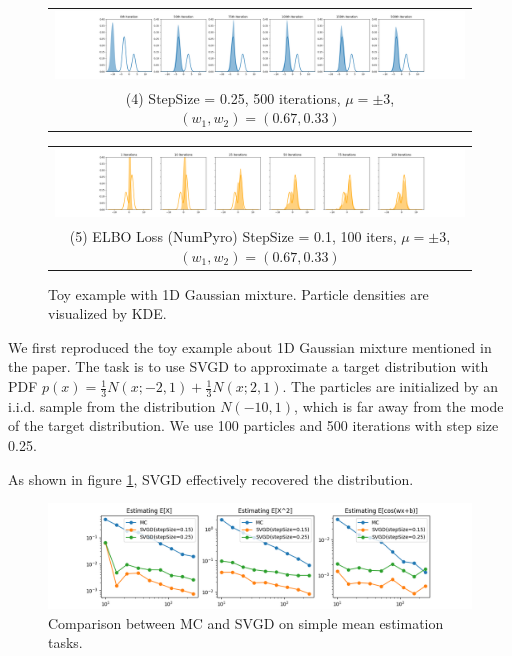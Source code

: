 \begin{figure}[!htbp]
    \begin{tabular}{@{}c@{}}
        \includegraphics[width=\textwidth]{figs/toy-figure1_step0.25_mu3.0_w0.67_gaussian.png} \\
        \small (4) StepSize = 0.25, 500 iterations, $\mu = \pm 3$, $(w_1, w_2) = (0.67, 0.33)$
    \end{tabular}
    
    
    \begin{tabular}{@{}c@{}}
        \includegraphics[width=\textwidth]{figs/toy-figure1-numpyro.png} \\
        \small (5) ELBO Loss (NumPyro) StepSize = 0.1, 100 iters, $\mu = \pm 3$, $(w_1, w_2) = (0.67, 0.33)$
    \end{tabular}
     
    \caption{Toy example with 1D Gaussian mixture. Particle densities are visualized by KDE.}
    \label{fig:toy1dgaussian}
\end{figure}

We first reproduced the toy example about 1D Gaussian mixture mentioned in the paper. The task is to use SVGD to approximate a target distribution with PDF $p(x) = \frac{1}{3} N(x; -2, 1) + \frac{1}{3} N(x; 2, 1)$. The particles are initialized by an i.i.d. sample from the distribution $N(-10, 1)$, which is far away from the mode of the target distribution. We use 100 particles and 500 iterations with step size 0.25. 

As shown in figure \ref{fig:toy1dgaussian}, SVGD effectively recovered the distribution.

\begin{figure}[!htbp]
    \centering
    \includegraphics[width=\textwidth]{figs/toy-figure2-merged.png}
    \caption{Comparison between MC and SVGD on simple mean estimation tasks. }
    \label{fig:my_label}
\end{figure}

